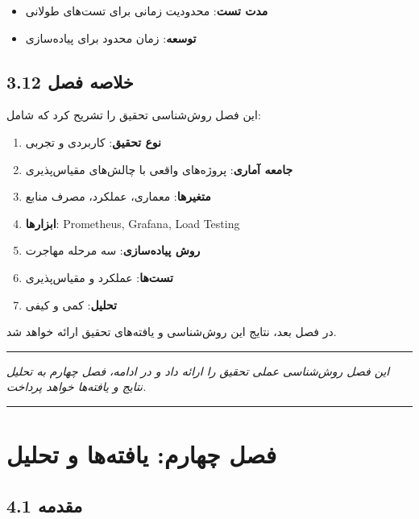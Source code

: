\documentclass[
]{article}
\providecommand{\tightlist}{%
  \setlength{\itemsep}{0pt}\setlength{\parskip}{0pt}}
\begin{document}
\begin{itemize}
\tightlist
\item
  \textbf{مدت تست}: محدودیت زمانی برای تست‌های طولانی
\item
  \textbf{توسعه}: زمان محدود برای پیاده‌سازی
\end{itemize}

\subsection{3.12 خلاصه
فصل}\label{ux62eux644ux627ux635ux647-ux641ux635ux644-1}

این فصل روش‌شناسی تحقیق را تشریح کرد که شامل:

\begin{enumerate}
\def\labelenumi{\arabic{enumi}.}
\tightlist
\item
  \textbf{نوع تحقیق}: کاربردی و تجربی
\item
  \textbf{جامعه آماری}: پروژه‌های واقعی با چالش‌های مقیاس‌پذیری
\item
  \textbf{متغیرها}: معماری، عملکرد، مصرف منابع
\item
  \textbf{ابزارها}: Prometheus, Grafana, Load Testing
\item
  \textbf{روش پیاده‌سازی}: سه مرحله مهاجرت
\item
  \textbf{تست‌ها}: عملکرد و مقیاس‌پذیری
\item
  \textbf{تحلیل}: کمی و کیفی
\end{enumerate}

در فصل بعد، نتایج این روش‌شناسی و یافته‌های تحقیق ارائه خواهد شد.

\begin{center}\rule{0.5\linewidth}{0.5pt}\end{center}

\emph{این فصل روش‌شناسی عملی تحقیق را ارائه داد و در ادامه، فصل چهارم به
تحلیل نتایج و یافته‌ها خواهد پرداخت.}

\begin{center}\rule{0.5\linewidth}{0.5pt}\end{center}

\section{فصل چهارم: یافته‌ها و
تحلیل}\label{ux641ux635ux644-ux686ux647ux627ux631ux645-ux6ccux627ux641ux62aux647ux647ux627-ux648-ux62aux62dux644ux6ccux644}

\subsection{4.1 مقدمه}\label{ux645ux642ux62fux645ux647-2}
\end{document}
